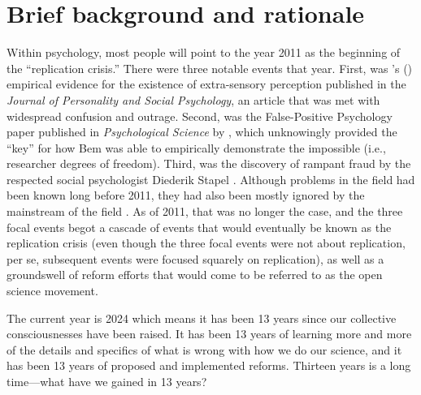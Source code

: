 \documentclass[authordate, empirical]{jote-new-article}
\begin{document}
\section{Brief background and rationale}







Within psychology, most people will point to the year 2011 as the beginning of the “replication crisis.” There were three notable events that year. First, was \citeauthor{Bem2011}'s (\hspace*{-2pt}\citeyear{Bem2011}) empirical evidence for the existence of extra-sensory perception published in the \emph{Journal of Personality and Social Psychology}, an article that was met with widespread confusion and outrage. Second, was the False-Positive Psychology paper published in \emph{Psychological Science} by \textcite{Simmons2011}, which unknowingly provided the “key” for how Bem was able to empirically demonstrate the impossible (i.e., researcher degrees of freedom). Third, was the discovery of rampant fraud by the respected social psychologist Diederik Stapel \parencites{Wicherts2011}. Although problems in the field had been known long before 2011, they had also been mostly ignored by the mainstream of the field \parencites[see][for several examples]{Syed2019}. As of 2011, that was no longer the case, and the three focal events begot a cascade of events that would eventually be known as the replication crisis (even though the three focal events were not about replication, per se, subsequent events were focused squarely on replication), as well as a groundswell of reform efforts that would come to be referred to as the open science movement.







The current year is 2024 which means it has been 13 years since our collective consciousnesses have been raised. It has been 13 years of learning more and more of the details and specifics of what is wrong with how we do our science, and it has been 13 years of proposed and implemented reforms. Thirteen years is a long time—what have we gained in 13 years?
\end{document}
